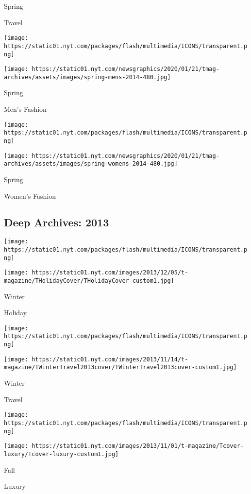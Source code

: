 Spring

Travel

\href{https://www.nytimes.com/indexes/2014/03/09/t-magazine/mens-fashion-issue/index.html}{}

\texttt{[image: https://static01.nyt.com/packages/flash/multimedia/ICONS/transparent.png]}

\texttt{[image: https://static01.nyt.com/newsgraphics/2020/01/21/tmag-archives/assets/images/spring-mens-2014-480.jpg]}

Spring

Men's Fashion

\href{https://www.nytimes.com/indexes/2014/02/16/t-magazine/womens-fashion-issue/index.html}{}

\texttt{[image: https://static01.nyt.com/packages/flash/multimedia/ICONS/transparent.png]}

\texttt{[image: https://static01.nyt.com/newsgraphics/2020/01/21/tmag-archives/assets/images/spring-womens-2014-480.jpg]}

Spring

Women's Fashion

\hypertarget{deep-archives-2013}{%
\subsection{Deep Archives: 2013}\label{deep-archives-2013}}

\texttt{[image: https://static01.nyt.com/packages/flash/multimedia/ICONS/transparent.png]}

\texttt{[image: https://static01.nyt.com/images/2013/12/05/t-magazine/THolidayCover/THolidayCover-custom1.jpg]}

Winter

Holiday

\texttt{[image: https://static01.nyt.com/packages/flash/multimedia/ICONS/transparent.png]}

\texttt{[image: https://static01.nyt.com/images/2013/11/14/t-magazine/TWinterTravel2013cover/TWinterTravel2013cover-custom1.jpg]}

Winter

Travel

\texttt{[image: https://static01.nyt.com/packages/flash/multimedia/ICONS/transparent.png]}

\texttt{[image: https://static01.nyt.com/images/2013/11/01/t-magazine/Tcover-luxury/Tcover-luxury-custom1.jpg]}

Fall

Luxury

